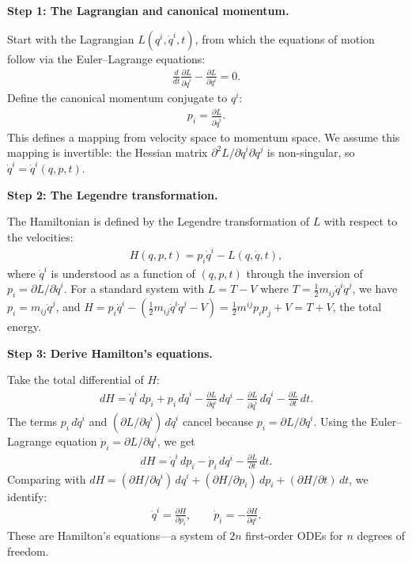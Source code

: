 \textbf{Step 1: The Lagrangian and canonical momentum.}

Start with the Lagrangian $L(q^i, \dot{q}^i, t)$, from which the equations of motion follow via the Euler--Lagrange equations:
\begin{align}
\frac{d}{dt}\frac{\partial L}{\partial\dot{q}^i} - \frac{\partial L}{\partial q^i} = 0.
\end{align}
Define the canonical momentum conjugate to $q^i$:
\begin{align}
p_i = \frac{\partial L}{\partial\dot{q}^i}.
\end{align}
This defines a mapping from velocity space to momentum space. We assume this mapping is invertible: the Hessian matrix $\partial^2 L/\partial\dot{q}^i\partial\dot{q}^j$ is non-singular, so $\dot{q}^i = \dot{q}^i(q, p, t)$.

\textbf{Step 2: The Legendre transformation.}

The Hamiltonian is defined by the Legendre transformation of $L$ with respect to the velocities:
\begin{align}
H(q, p, t) = p_i\dot{q}^i - L(q, \dot{q}, t),
\end{align}
where $\dot{q}^i$ is understood as a function of $(q, p, t)$ through the inversion of $p_i = \partial L/\partial\dot{q}^i$. For a standard system with $L = T - V$ where $T = \frac{1}{2}m_{ij}\dot{q}^i\dot{q}^j$, we have $p_i = m_{ij}\dot{q}^j$, and $H = p_i\dot{q}^i - (\frac{1}{2}m_{ij}\dot{q}^i\dot{q}^j - V) = \frac{1}{2}m^{ij}p_ip_j + V = T + V$, the total energy.

\textbf{Step 3: Derive Hamilton's equations.}

Take the total differential of $H$:
\begin{align}
dH = \dot{q}^i\,dp_i + p_i\,d\dot{q}^i - \frac{\partial L}{\partial q^i}\,dq^i - \frac{\partial L}{\partial\dot{q}^i}\,d\dot{q}^i - \frac{\partial L}{\partial t}\,dt.
\end{align}
The terms $p_i\,d\dot{q}^i$ and $(\partial L/\partial\dot{q}^i)\,d\dot{q}^i$ cancel because $p_i = \partial L/\partial\dot{q}^i$. Using the Euler--Lagrange equation $\dot{p}_i = \partial L/\partial q^i$, we get
\begin{align}
dH = \dot{q}^i\,dp_i - \dot{p}_i\,dq^i - \frac{\partial L}{\partial t}\,dt.
\end{align}
Comparing with $dH = (\partial H/\partial q^i)\,dq^i + (\partial H/\partial p_i)\,dp_i + (\partial H/\partial t)\,dt$, we identify:
\begin{align}
\boxed{\dot{q}^i = \frac{\partial H}{\partial p_i}, \qquad \dot{p}_i = -\frac{\partial H}{\partial q^i}.}
\end{align}
These are Hamilton's equations---a system of $2n$ first-order ODEs for $n$ degrees of freedom.

